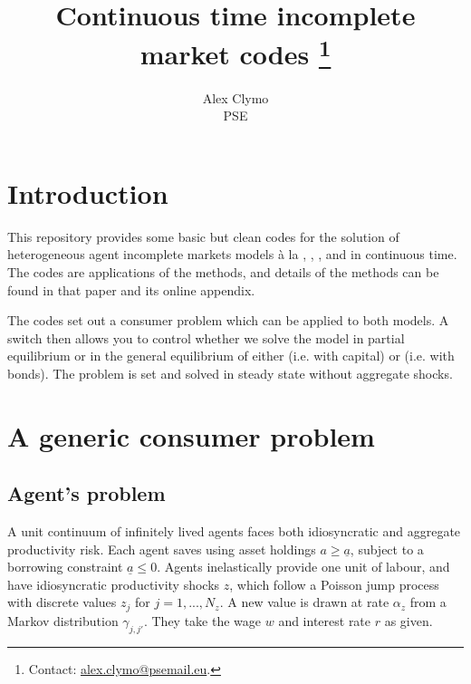 \documentclass[11pt,english]{article}
\title{Continuous time incomplete market codes \thanks{\noindent \hspace*{-2em} %
Contact: \url{alex.clymo@psemail.eu}. 
}}
\author{Alex Clymo \\ PSE}
\begin{document}
\maketitle



\onehalfspacing

\section{Introduction} 
\label{sec:introduction} 

This repository provides some basic but clean codes for the solution of heterogeneous agent incomplete markets models à la \cite{BewleyStationary1986}, \cite{ImrohorogluCost1989}, \cite{HuggettRiskfree1993}, and \cite{AiyagariUninsured1994} in continuous time. The codes are applications of the \cite{AchdouEtAlIncome2022} methods, and details of the methods can be found in that paper and its online appendix. 

The codes set out a consumer problem which can be applied to both models. A switch then allows you to control whether we solve the model in partial equilibrium or in the general equilibrium of either \cite{AiyagariUninsured1994} (i.e. with capital) or \cite{HuggettRiskfree1993} (i.e. with bonds). The problem is set and solved in steady state without aggregate shocks. 


\section{A generic consumer problem}

\subsection{Agent's problem}

A unit continuum of infinitely lived agents faces both idiosyncratic and aggregate productivity risk. Each agent saves using asset holdings \( a \geq \underline{a} \), subject to a borrowing constraint $\underline{a} \leq 0$. Agents inelastically provide one unit of labour, and have idiosyncratic productivity shocks \( z \), which follow a Poisson jump process with discrete values $z_j$ for $j=1,...,N_z$. A new value is drawn at rate $\alpha_z$ from a Markov distribution $\gamma_{j,j'}$. They take the wage $w$ and interest rate $r$ as given. 
\end{document}
